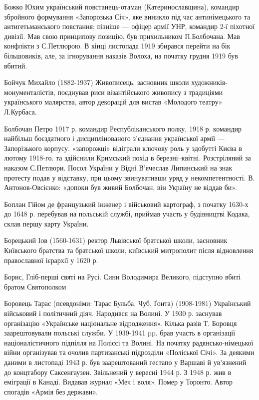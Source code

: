 Божко Юхим український повстанець-отаман (Катеринославщина), командир збройного формування «Запорозька Січ», яке виникло під час антинімецького та антигетьманського повстання; пізніше --- офіцер армії УНР, командир 2-ї піхотної дивізії. Мав свою принципову позицію, був прихильником П.Болбочана. Мав конфлікти з С.Петлюрою. В кінці листопада 1919 збирався перейти на бік більшовиків, але, за ігнорування наказів Волоха, на початку грудня 1919 був вбитий.

Бойчук Михайло (1882-1937) Живописець, засновник школи художників-монументалістів, поєднував риси візантійського живопису з традиціями українського малярства, автор декорацій для вистав «Молодого театру» Л.Курбаса.

Болбочан Петро 1917 р. командир Республіканського полку, 1918 р. командир найбільш боєздатного і дисциплінованого з’єднання української армії --- Запорізького корпусу. «запорожці» відіграли ключову роль у здобутті Києва в лютому 1918-го. та здійснили Кримський похід в березні–квітні. Розстріляний за наказом С.Петлюри. Посол України у Відні В’ячеслав Липинський на знак протесту подав у відставку, при цьому звинувативши уряд у некомпетентності. В. Антонов-Овсієнко: «допоки був живий Болбочан, він Україну не віддав би». 

Боплан Гійом де  французький інженер і військовий картограф, з початку 1630-х до 1648 р. перебував на польській службі, приймав участь у будівництві Кодака, склав першу карту України.

Борецький Іов  (1560-1631) ректор Львівської братської школи, засновник Київського братства та братської школи, київський митрополит після відновлення православної ієрархії у 1620 р.

Борис, Гліб-перші святі на Русі. Сини Володимира Великого, підступно вбиті братом Святополком

Боровець Тарас (псевдоніми: Тарас Бульба, Чуб, Ґонта) (1908-1981) Український військовий і політичний діяч. Народився на Волині. У 1930 р. заснував організацію «Українське національне відродження». Кілька разів Т. Боровця заарештовували польські служби. У 1939-1941 pp. брав участь в організації націоналістичного підпілля на Поліссі та Волині. На початку радянсько-німецької війни організував та очолив партизанські підрозділи «Поліської Січі». За деякими даними в листопаді 1943 р. був заарештований гестапо у Варшаві й ув'язнений до концтабору Саксенгаузен. Звільнений у вересні 1944 р. З 1948 р. жив в еміграції в Канаді. Видавав журнал «Меч і воля». Помер у Торонто. Автор спогадів «Армія без держави».

